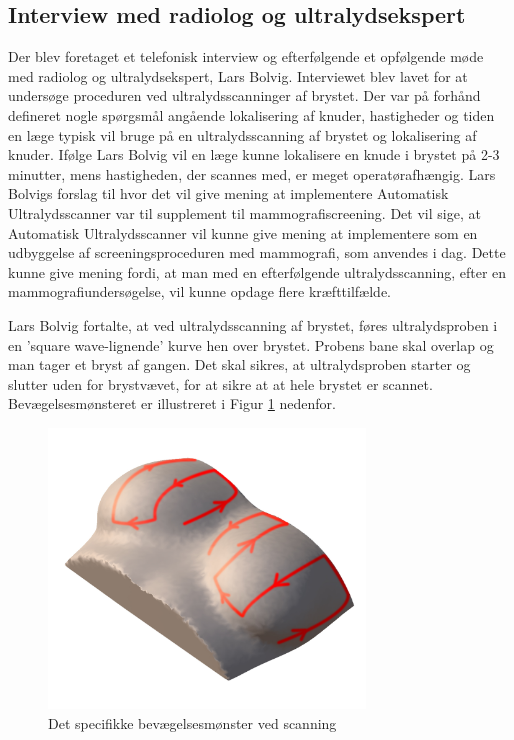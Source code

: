 \subsection{Interview med radiolog og ultralydsekspert}
Der blev foretaget et telefonisk interview og efterfølgende et opfølgende møde med radiolog og ultralydsekspert, Lars Bolvig. Interviewet blev lavet for at undersøge proceduren ved ultralydsscanninger af brystet. Der var på forhånd defineret nogle spørgsmål angående lokalisering af knuder, hastigheder og tiden en læge typisk vil bruge på en ultralydsscanning af brystet og lokalisering af knuder. Ifølge Lars Bolvig vil en læge kunne lokalisere en knude i brystet på 2-3 minutter, mens hastigheden, der scannes med, er meget operatørafhængig. Lars Bolvigs forslag til hvor det vil give mening at implementere Automatisk Ultralydsscanner var til supplement til mammografiscreening. Det vil sige, at Automatisk Ultralydsscanner vil kunne give mening at implementere som en udbyggelse af screeningsproceduren med mammografi, som anvendes i dag. Dette kunne give mening fordi, at man med en efterfølgende ultralydsscanning, efter en mammografiundersøgelse, vil kunne opdage flere kræfttilfælde. 

Lars Bolvig fortalte, at ved ultralydsscanning af brystet, føres ultralydsproben i en 'square wave-lignende' kurve hen over brystet. Probens bane skal overlap og man tager et bryst af gangen. Det skal sikres, at ultralydsproben starter og slutter uden for brystvævet, for at sikre at at hele brystet er scannet. Bevægelsesmønsteret er illustreret i Figur \ref{Probensbevagelse} nedenfor. 

\begin{figure}[H]
    \centering
    \includegraphics[width=0.75\textwidth]{figurer/d/probebevagelse}
    \caption{Det specifikke bevægelsesmønster ved scanning}
    \label{Probensbevagelse}
\end{figure}

